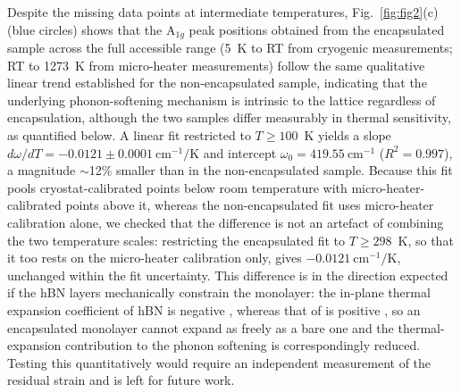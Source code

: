 \documentclass[letterpaper]{article}
\begin{document}
Despite the missing data points at intermediate temperatures,
Fig.~\ref{fig:fig2}(c) (blue circles) shows that the A$_{1g}$ peak positions
obtained from the encapsulated sample across the full accessible range (5~K to
RT from cryogenic measurements; RT to 1273~K from micro-heater measurements)
follow the same qualitative linear trend established for the non-encapsulated
sample, indicating that the underlying phonon-softening mechanism is intrinsic
to the  lattice regardless of encapsulation, although the two samples
differ measurably in thermal sensitivity, as quantified below. A linear fit
restricted to $T \geq 100$~K yields a slope
$d\omega/dT = -0.0121 \pm 0.0001~\mathrm{cm^{-1}/K}$ and intercept
$\omega_0 = 419.55~\mathrm{cm^{-1}}$ ($R^2 = 0.997$), a magnitude
$\sim$12\% smaller than in the non-encapsulated sample. Because this fit pools
cryostat-calibrated points below room temperature with micro-heater-calibrated
points above it, whereas the non-encapsulated fit uses micro-heater
calibration alone, we checked that the difference is not an artefact of
combining the two temperature scales: restricting the encapsulated fit to
$T \geq 298$~K, so that it too rests on the micro-heater calibration only,
gives $-0.0121~\mathrm{cm^{-1}/K}$, unchanged within the fit uncertainty.
This difference is in
the direction expected if the hBN layers mechanically constrain the monolayer:
the in-plane thermal expansion coefficient of hBN is negative
\cite{androulidakis-2020}, whereas that of  is positive
\cite{huang-2016}, so an encapsulated monolayer cannot expand as freely as a
bare one and the thermal-expansion contribution to the phonon softening is
correspondingly reduced. Testing this quantitatively would require an
independent measurement of the residual strain and is left for future work.
\end{document}
